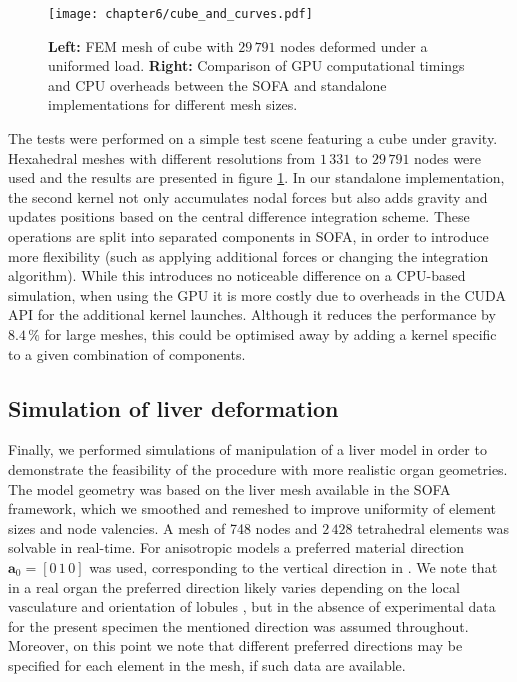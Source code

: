 \begin{figure}[ht]
\texttt{[image: chapter6/cube\_and\_curves.pdf]}
\caption [Computational timings within SOFA] {\textbf{Left:} FEM mesh of cube with $29\,791$ nodes deformed under a uniformed load. \textbf{Right:} Comparison of GPU computational timings and CPU overheads between the SOFA and standalone implementations for different mesh sizes. }
\label{chap6:fig-cube_and_curves}
\end{figure}

The tests were performed on a simple test scene featuring a cube under gravity. Hexahedral meshes with different resolutions from $1\,331$ to $29\,791$ nodes were used and the results are presented in figure \ref{chap6:fig-cube_and_curves}. In our standalone implementation, the second kernel not only accumulates nodal forces but also adds gravity and updates positions based on the central difference integration scheme. These operations are split into separated components in SOFA, in order to introduce more flexibility (such as applying additional forces or changing the integration algorithm). While this introduces no noticeable difference on a CPU-based simulation, when using the GPU it is more costly due to overheads in the CUDA API for the additional kernel launches. Although it reduces the performance by $8.4\, \%$ for large meshes, this could be optimised away by adding a kernel specific to a given combination of components.
		
	
	\subsection{Simulation of liver deformation} \label{chap6:liverSimu}
Finally, we performed simulations of manipulation of a liver model in order to demonstrate the feasibility of the procedure with more realistic organ geometries. The model geometry was based on the liver mesh available in the SOFA framework, which we smoothed and remeshed to improve uniformity of element sizes and node valencies. A mesh of 748 nodes and $2\,428$ tetrahedral elements was solvable in real-time. For anisotropic models a preferred material direction $\mathbf{a}_0 = [0\, 1\, 0] $ was used, corresponding to the vertical direction in . We note that in a real organ the preferred direction likely varies depending on the local vasculature and orientation of lobules \citep{Chui07}, but in the absence of experimental data for the present specimen the mentioned direction was assumed throughout. Moreover, on this point we note that different preferred directions may be specified for each element in the mesh, if such data are available. 

